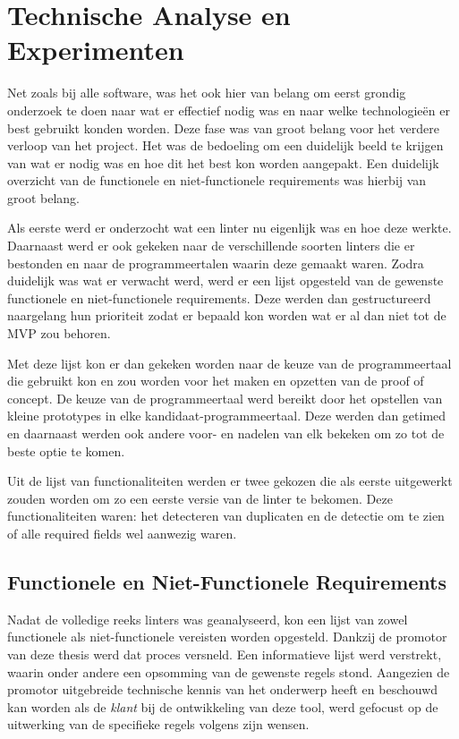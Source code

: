\chapter{Technische Analyse en Experimenten}
\label{ch:fase2}

Net zoals bij alle software, was het ook hier van belang om eerst grondig onderzoek te doen naar wat er effectief nodig was en naar welke technologieën er best gebruikt konden worden. Deze fase was van groot belang voor het verdere verloop van het project. Het was de bedoeling om een duidelijk beeld te krijgen van wat er nodig was en hoe dit het best kon worden aangepakt. Een duidelijk overzicht van de functionele en niet-functionele requirements was hierbij van groot belang.

Als eerste werd er onderzocht wat een linter nu eigenlijk was en hoe deze werkte. Daarnaast werd er ook gekeken naar de verschillende soorten linters die er bestonden en naar de programmeertalen waarin deze gemaakt waren. Zodra duidelijk was wat er verwacht werd, werd er een lijst opgesteld van de gewenste functionele en niet-functionele requirements. Deze werden dan gestructureerd naargelang hun prioriteit zodat er bepaald kon worden wat er al dan niet tot de \acrfull{MVP} zou behoren.

Met deze lijst kon er dan gekeken worden naar de keuze van de programmeertaal die gebruikt kon en zou worden voor het maken en opzetten van de proof of concept. De keuze van de programmeertaal werd bereikt door het opstellen van kleine prototypes in elke kandidaat-programmeertaal. Deze werden dan getimed en daarnaast werden ook andere voor- en nadelen van elk bekeken om zo tot de beste optie te komen.

Uit de lijst van functionaliteiten werden er twee gekozen die als eerste uitgewerkt zouden worden om zo een eerste versie van de linter te bekomen. Deze functionaliteiten waren: het detecteren van duplicaten en de detectie om te zien of alle required fields wel aanwezig waren.

\section{Functionele en Niet-Functionele Requirements}
Nadat de volledige reeks linters was geanalyseerd, kon een lijst van zowel functionele als niet-functionele vereisten worden opgesteld. Dankzij de promotor van deze thesis werd dat proces versneld. Een informatieve lijst werd verstrekt, waarin onder andere een opsomming van de gewenste regels stond. Aangezien de promotor uitgebreide technische kennis van het onderwerp heeft en beschouwd kan worden als de \emph{klant} bij de ontwikkeling van deze tool, werd gefocust op de uitwerking van de specifieke regels volgens zijn wensen.\newline

